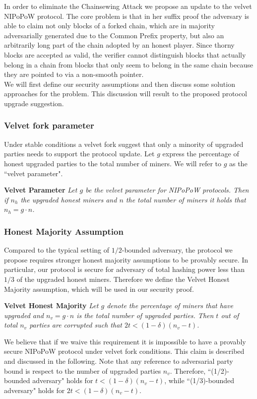 In order to eliminate the Chainsewing Attack we propose an update to the velvet
NIPoPoW protocol. The core problem is that in her suffix proof the adversary
is able to claim not only blocks of a forked chain,  which are in majority adversarially
generated due to the Common Prefix property, but also an arbitrarily long part of the
chain adopted by an honest player. Since thorny blocks are accepted as valid,
the verifier cannot distinguish blocks that actually belong in a chain from
blocks that only seem to belong in the same chain because they are pointed to
via a non-smooth pointer. \\

We will first define our security assumptions and then discuss some solution
approaches for the problem. This discussion will result to the proposed protocol
upgrade suggestion.

\subsubsection{Velvet fork parameter}
Under stable conditions a velvet fork suggest that only a minority of upgraded parties needs to support the protocol update. Let $g$ express the percentage of honest upgraded parties to the total number of miners. We will refer to $g$ as the ``velvet parameter".

\begin{defn}{\textbf{Velvet Parameter}}
	\textit{Let $g$ be the velvet parameter for NIPoPoW protocols.  Then if $n_h$ the upgraded honest miners and $n$ the total number of miners it holds that $n_h = g \cdot n$.}
	\label{defn:velvet_honest_majority}
\end{defn}

\subsubsection{Honest Majority Assumption}
Compared to the typical setting of $1/2$-bounded adversary, the protocol we
propose requires stronger honest majority assumptions to be provably secure. 
In particular, our protocol is secure for adversary of total hashing power 
less than $1/3$ of the upgraded honest miners. Therefore we define the Velvet
Honest Majority assumption, which will be used in our security proof.

\begin{defn}{\textbf{Velvet Honest Majority}}
	\textit{Let $g$ denote the percentage of miners that have upgraded and $n_v = g
	\cdot n$ is the total number of upgraded parties. Then $t$ out of total $n_v$
	parties are corrupted such that $2t < (1 - \delta)(n_v-t)$. }
	\label{defn:smooth_pointer}
\end{defn}
We believe that if we waive this requirement it is impossible to have a provably 
secure NIPoPoW protocol under velvet fork conditions.
This claim is described and discussed in the following.
Note that any reference to adversarial party bound is respect to the number of
upgraded parties $n_v$. Therefore, ``(1/2)-bounded adversary" holds for
$t < (1 - \delta)(n_v - t)$, while ``(1/3)-bounded adversary" holds for
$2t < (1 - \delta)(n_v - t)$.


